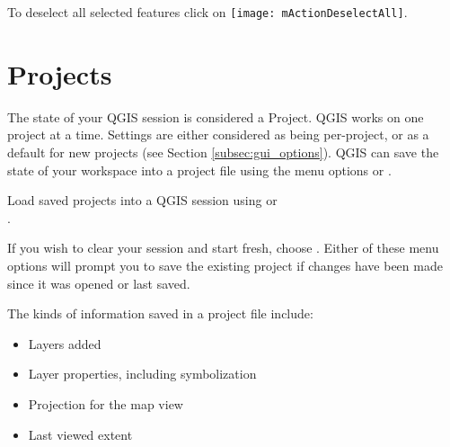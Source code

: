 \begin{description}
\item {}
\item {}
\item {}
\item {}
\item {}
\end{description} 

To deselect all selected features click on \texttt{[image: mActionDeselectAll]}.

\section{Projects}\label{sec:projects}

The state of your QGIS session is considered a Project.  QGIS
works on one project at a time.  Settings are either considered
as being per-project, or as a default for new projects (see
Section \ref{subsec:gui_options}). QGIS can save the state of your
workspace into a project file using the menu options
 \arrow {}
or  \arrow {}.

Load saved projects into a QGIS session using
 \arrow {}
or  \arrow \\
.

If you wish to clear your session and start fresh, choose
 \arrow {}.
Either of these menu options will prompt you to save the existing project
if changes have been made since it was opened or last saved.

The kinds of information saved in a project file include:

\begin{itemize}
\item Layers added
\item Layer properties, including symbolization
\item Projection for the map view
\item Last viewed extent
\end{itemize}

